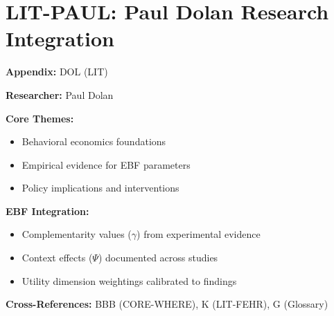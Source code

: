 %
%

\chapter{LIT-PAUL: Paul Dolan Research Integration}
\label{app:dol}

\begin{abstract}
This appendix integrates the research contributions of Paul Dolan into the
Evidence-Based Framework. It documents key papers, core findings, and their
integration with EBF dimensions including complementarity parameters ($\gamma$),
context factors ($\Psi$), and utility dimensions.
\end{abstract}

\begin{tcolorbox}[colback=blue!5!white, colframe=blue!75!black,
    title=Quick Reference: Paul Dolan Research]

\textbf{Appendix:} DOL (LIT)

\textbf{Researcher:} Paul Dolan

\textbf{Core Themes:}
\begin{itemize}[nosep]
\item Behavioral economics foundations
\item Empirical evidence for EBF parameters
\item Policy implications and interventions
\end{itemize}

\textbf{EBF Integration:}
\begin{itemize}[nosep]
\item Complementarity values ($\gamma$) from experimental evidence
\item Context effects ($\Psi$) documented across studies
\item Utility dimension weightings calibrated to findings
\end{itemize}

\textbf{Cross-References:} BBB (CORE-WHERE), K (LIT-FEHR), G (Glossary)
\end{tcolorbox}

